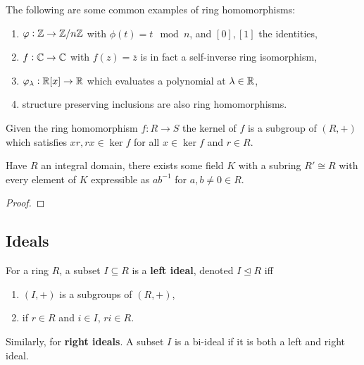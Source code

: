 \documentclass[../Year2.tex]{subfiles}
\begin{document}
\begin{examples}
    The following are some common examples of ring homomorphisms: \begin{enumerate}
        \item $\varphi:\mathbb{Z}\rightarrow\mathbb{Z}/n\mathbb{Z}$ with $\phi(t)= t\mod{n}$, and $[0], [1]$ the identities,
        \item $f:\mathbb{C}\rightarrow\mathbb{C}$ with $f(z)=\overline{z}$ is in fact a self-inverse ring isomorphism,
        \item $\varphi_\lambda:\mathbb{R}[x]\rightarrow\mathbb{R}$ which evaluates a polynomial at $\lambda\in\mathbb{R}$,
        \item structure preserving inclusions are also ring homomorphisms.
    \end{enumerate}
\end{examples}

\begin{lemma}
    Given the ring homomorphism $f:R\rightarrow S$ the kernel of $f$ is a subgroup of $(R,+)$ which satisfies $xr,rx\in\ker f$ for all $x\in \ker f$ and $r\in R$.
\end{lemma}

\begin{theorem}
    Have $R$ an integral domain, there exists some field $K$ with a subring $R'\cong R$ with every element of $K$ expressible as $ab^{-1}$ for $a,b\neq0\in R$. \begin{proof}
        
    \end{proof}
\end{theorem}

\subsection{Ideals}

\begin{definition}[Ideal]
    For a ring $R$, a subset $I\subseteq R$ is a \textbf{left ideal}, denoted $I\unlhd R$ iff \begin{enumerate}
        \item $(I,+)$ is a subgroups of $(R,+)$,
        \item if $r\in R$ and $i\in I$, $ri\in R$.
    \end{enumerate} Similarly, for \textbf{right ideals}. A subset $I$ is a bi-ideal if it is both a left and right ideal.
\end{definition}

\begin{proposition}
    
\end{proposition}
\end{document}
